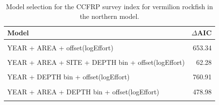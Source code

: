 \documentclass[11pt,
  english,
]{article}
\begin{document}
\begin{table}

\caption{\label{tab:tab-model-select-ccfrp}Model selection for the CCFRP survey index for vermilion rockfish in the northern model.}
\centering
\begin{tabular}[t]{lr}
\toprule
Model & $\Delta$AIC\\
\midrule
\cellcolor{gray!6}{1 + offset(logEffort)} & \cellcolor{gray!6}{1191.26}\\
YEAR + AREA + offset(logEffort) & 653.34\\
\cellcolor{gray!6}{YEAR + AREA + SITE + offset(logEffort)} & \cellcolor{gray!6}{188.88}\\
YEAR + AREA + SITE + DEPTH bin + offset(logEffort) & 62.28\\
\cellcolor{gray!6}{YEAR + SITE + offset(logEffort)} & \cellcolor{gray!6}{579.86}\\
\addlinespace
YEAR + DEPTH bin + offset(logEffort) & 760.91\\
\cellcolor{gray!6}{YEAR + SITE + DEPTH bin + offset(logEffort)} & \cellcolor{gray!6}{397.53}\\
YEAR + AREA + DEPTH bin + offset(logEffort) & 478.98\\
\cellcolor{gray!6}{YEAR + AREA + SITE + DEPTH bin + YEAR:SITE + offset(logEffort)} & \cellcolor{gray!6}{0.00}\\
\bottomrule
\end{tabular}
\end{table}

\FloatBarrier
\end{document}
